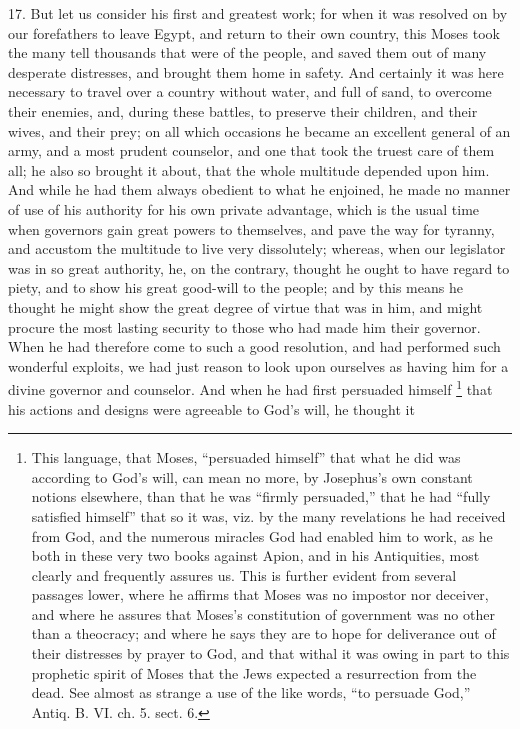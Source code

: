 17. But let us consider his first and greatest work; for when it was
resolved on by our forefathers to leave Egypt, and return to their own
country, this Moses took the many tell thousands that were of the people,
and saved them out of many desperate distresses, and brought them home in
safety. And certainly it was here necessary to travel over a country
without water, and full of sand, to overcome their enemies, and, during
these battles, to preserve their children, and their wives, and their
prey; on all which occasions he became an excellent general of an army,
and a most prudent counselor, and one that took the truest care of them
all; he also so brought it about, that the whole multitude depended upon
him. And while he had them always obedient to what he enjoined, he made no
manner of use of his authority for his own private advantage, which is the
usual time when governors gain great powers to themselves, and pave the
way for tyranny, and accustom the multitude to live very dissolutely;
whereas, when our legislator was in so great authority, he, on the
contrary, thought he ought to have regard to piety, and to show his great
good-will to the people; and by this means he thought he might show the
great degree of virtue that was in him, and might procure the most lasting
security to those who had made him their governor. When he had therefore
come to such a good resolution, and had performed such wonderful exploits,
we had just reason to look upon ourselves as having him for a divine
governor and counselor. And when he had first persuaded himself \footnote{This language, that
Moses, ``persuaded himself'' that what he did was according to God's will,
can mean no more, by Josephus's own constant notions elsewhere, than that
he was ``firmly persuaded,'' that he had ``fully satisfied himself'' that so
it was, viz. by the many revelations he had received from God, and the
numerous miracles God had enabled him to work, as he both in these very
two books against Apion, and in his Antiquities, most clearly and
frequently assures us. This is further evident from several passages
lower, where he affirms that Moses was no impostor nor deceiver, and where
he assures that Moses's constitution of government was no other than a
theocracy; and where he says they are to hope for deliverance out of their
distresses by prayer to God, and that withal it was owing in part to this
prophetic spirit of Moses that the Jews expected a resurrection from the
dead. See almost as strange a use of the like words, ``to persuade God,''
Antiq. B. VI. ch. 5. sect. 6.}
that his actions and designs were agreeable to God's will, he thought it
